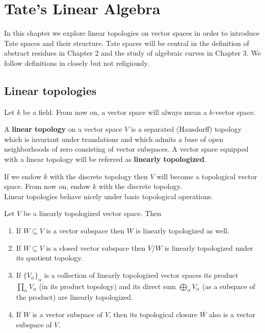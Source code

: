 \chapter{Tate's Linear Algebra}\label{ch:tate-linear-algebra}
In this chapter we explore linear topologies on vector spaces in order to introduce Tate spaces and their structure. Tate spaces will be central in the definition of abstract residues in Chapter 2 and the study of algebraic curves in Chapter 3. We follow definitions in \cite{Chiral} closely but not religiously.
\section{Linear topologies}
Let $k$ be a field. From now on, a vector space will always mean a $k$-vector space.
\begin{definition}\label{def:linear_topology}
A \textbf{linear topology} on a vector space $V$ is a separated (Hausdorff) topology which is invariant under translations and which admits a base of open neighborhoods of zero consisting of vector subspaces. A vector space equipped with a linear topology will be referred as \textbf{linearly topologized}.
\end{definition}
If we endow $k$ with the discrete topology then $V$ will become a topological vector space. From now on, endow $k$ with the discrete topology. \\
Linear topologies behave nicely under basic topological operations.
\begin{proposition}\label{prop:linear_topologies_properties}
Let $V$ be a linearly topologized vector space. Then
	\begin{enumerate}[label = (\alph*)]
		\item If $W \subseteq V$ is a vector subspace then $W$ is linearly topologized as well.
		\item If $W \subseteq V$ is a closed vector subspace then $V/W$ is linearly topologized under its quotient topology.
		\item If $\{V_{\alpha}\}_{\alpha}$ is a collection of linearly topologized vector spaces its product $\prod_{\alpha} V_{\alpha}$ (in its product topology) and its direct sum $\bigoplus_{\alpha} V_{\alpha}$ (as a subspace of the product) are linearly topologized.
		\item If $W$ is a vector subspace of $V$, then its topological closure $\overline{W}$ also is a vector subspace of $V$.
	\end{enumerate}
\end{proposition}

